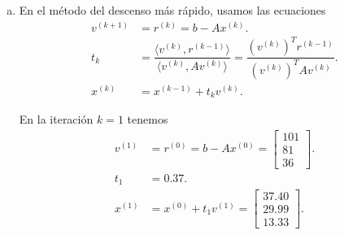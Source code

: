 \begin{frame}[fragile]
	\begin{columns}
		\begin{column}{0.48\textwidth}
			\inputminted[fontsize=\tiny,firstline=1,lastline=29]{text}{p4_sor.txt}
		\end{column}
		\begin{column}{0.48\textwidth}
			\inputminted[fontsize=\tiny,firstline=30,lastline=53]{text}{p4_sor.txt}
		\end{column}
	\end{columns}
\end{frame}

\begin{frame}
	\begin{solution}
		\begin{enumerate}[b)]
			\item

			      En el método del descenso más rápido, usamos las
			      ecuaciones
			      \begin{align*}
				      v^{\left(k+1\right)} & =
				      r^{\left(k\right)}=
				      b-Ax^{\left(k\right)}.   \\
				      t_{k}                & =
				      \dfrac{
					      \langle
					      v^{\left(k\right)},
					      r^{\left(k-1\right)}
					      \rangle
				      }{
					      \langle
					      v^{\left(k\right)},
					      Av^{\left(k\right)}
					      \rangle
				      }=
				      \dfrac{
				      \left(v^{\left(k\right)}\right)^{T}r^{\left(k-1\right)}
				      }{
				      \left(v^{\left(k\right)}\right)^{T}Av^{\left(k\right)}
				      }.                       \\
				      x^{\left(k\right)}   & =
				      x^{\left(k-1\right)}+
				      t_{k}v^{\left(k\right)}.
			      \end{align*}

			      En la iteración $k=1$ tenemos
			      \begin{align*}
				      v^{\left(1\right)} & =
				      r^{\left(0\right)}=
				      b-Ax^{\left(0\right)}=
				      \begin{bmatrix}
					      101 \\
					      81  \\
					      36
				      \end{bmatrix}.         \\
				      t_{1}              & =
				      0.37.                  \\
				      x^{\left(1\right)} & =
				      x^{\left(0\right)}+
				      t_{1}v^{\left(1\right)}=
				      \begin{bmatrix}
					      37.40 \\
					      29.99 \\
					      13.33
				      \end{bmatrix}.
			      \end{align*}


\end{enumerate}
\end{solution}
\end{frame}
